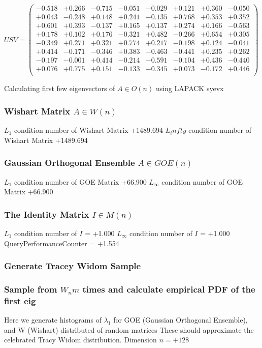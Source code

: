 \documentclass[9pt]{article}
\theoremstyle{plain}
\theoremstyle{definition}
\theoremstyle{remark}
\numberwithin{equation}{section}
\begin{document}
$U S V = \left(
\begin{array}{
cccccccc}
-0.518 & +0.266 & -0.715 & -0.051 & -0.029 & +0.121 & +0.360 & -0.050 \\
+0.043 & -0.248 & +0.148 & +0.241 & -0.135 & +0.768 & +0.353 & +0.352 \\
+0.601 & +0.393 & -0.137 & +0.165 & +0.137 & +0.274 & +0.166 & -0.563 \\
+0.178 & +0.102 & +0.176 & -0.321 & +0.482 & -0.266 & +0.654 & +0.305 \\
-0.349 & +0.271 & +0.321 & +0.774 & +0.217 & -0.198 & +0.124 & -0.041 \\
+0.414 & -0.171 & -0.346 & +0.383 & -0.463 & -0.441 & +0.235 & +0.262 \\
-0.197 & -0.001 & +0.414 & -0.214 & -0.591 & -0.104 & +0.436 & -0.440 \\
+0.076 & +0.775 & +0.151 & -0.133 & -0.345 & +0.073 & -0.172 & +0.446 \\
\end{array}
\right)$ \newline 

Calculating first few eigenvectors of $A \in O(n)$ using LAPACK syevx

\subsubsection{Wishart Matrix $A \in W(n)$}
$L_1$ condition number of Wishart Matrix +1489.694
$L_infty$ condition number of Wishart Matrix +1489.694
\subsubsection{Gaussian Orthogonal Ensemble $A \in GOE(n)$}
$L_1$ condition number of GOE Matrix +66.900
$L_\infty$ condition number of GOE Matrix +66.900
\subsubsection{The Identity Matrix $I \in M(n)$}
$L_1$ condition number of $I$ = +1.000
$L_\infty$ condition number of $I$ = +1.000
QueryPerformanceCounter  =  +1.554
\subsubsection{Generate Tracey Widom Sample}
\subsubsection{Sample from $W_n m$ times and calculate empirical PDF of the first eig}
Here we generate histograms of $\lambda_1$ for GOE (Gaussian Orthogonal Ensemble), and W (Wishart) 		 distributed of random matrices
These should approximate the celebrated Tracy Widom distribution.
Dimension $n = +128$
\end{document}
